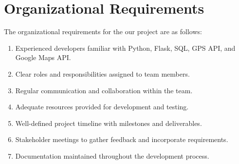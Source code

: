 \documentclass{BusMateSRS}
\begin{document}
\pagebreak


\section{Organizational Requirements}
The organizational requirements for the our project are as follows:

\begin{enumerate}
	\item Experienced developers familiar with Python, Flask, SQL,
	      GPS API, and Google Maps API.
	\item Clear roles and responsibilities assigned to team members.
	\item Regular communication and collaboration within the team.
	\item Adequate resources provided for development and testing.
	\item Well-defined project timeline with milestones and deliverables.
	\item Stakeholder meetings to gather feedback and incorporate requirements.
	\item Documentation maintained throughout the development process.
\end{enumerate}


\end{document}
